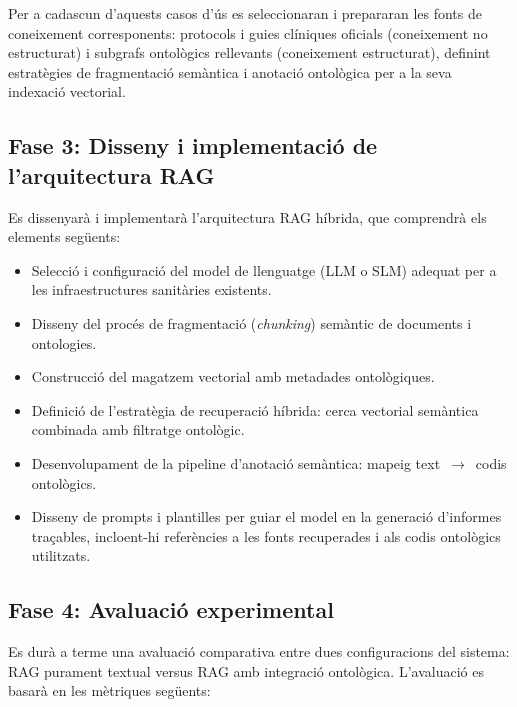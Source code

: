 \documentclass[11pt,a4paper]{article}
\begin{document}
Per a cadascun d'aquests casos d'ús es seleccionaran i prepararan les fonts de coneixement corresponents: protocols i guies clíniques oficials (coneixement no estructurat) i subgrafs ontològics rellevants (coneixement estructurat), definint estratègies de fragmentació semàntica i anotació ontològica per a la seva indexació vectorial.

\subsection*{Fase 3: Disseny i implementació de l'arquitectura RAG}
Es dissenyarà i implementarà l'arquitectura RAG híbrida, que comprendrà els elements següents:

\begin{itemize}
    \item Selecció i configuració del model de llenguatge (LLM o SLM) adequat per a les infraestructures sanitàries existents.
    \item Disseny del procés de fragmentació (\textit{chunking}) semàntic de documents i ontologies.
    \item Construcció del magatzem vectorial amb metadades ontològiques.
    \item Definició de l'estratègia de recuperació híbrida: cerca vectorial semàntica combinada amb filtratge ontològic.
    \item Desenvolupament de la pipeline d'anotació semàntica: mapeig text~$\to$~codis ontològics.
    \item Disseny de prompts i plantilles per guiar el model en la generació d'informes traçables, incloent-hi referències a les fonts recuperades i als codis ontològics utilitzats.
\end{itemize}

\subsection*{Fase 4: Avaluació experimental}

Es durà a terme una avaluació comparativa entre dues configuracions del sistema: RAG purament textual versus RAG amb integració ontològica. L'avaluació es basarà en les mètriques següents:
\end{document}
